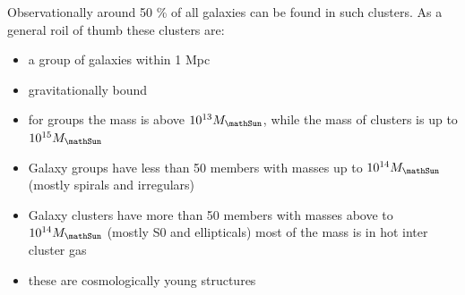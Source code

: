 \documentclass[11pt,a4paper]{article}
\begin{document}
Observationally around 50 \% of all galaxies can be found in such clusters.
As a general roil of thumb these clusters are: 
\begin{itemize}
    \item a group of galaxies within 1 Mpc
    \item gravitationally bound
    \item for groups the mass is above $10^{13} M_\mathSun$, while the mass of clusters is up to $10^{15} M_\mathSun$
    \item Galaxy groups have less than 50 members with masses up to $10^{14} M_\mathSun$ (mostly spirals and irregulars)
    \item Galaxy clusters have more than 50 members with masses above to $10^{14} M_\mathSun$ (mostly S0 and ellipticals) most of the mass is in hot inter cluster gas
    \item these are cosmologically young structures
\end{itemize}
\end{document}
